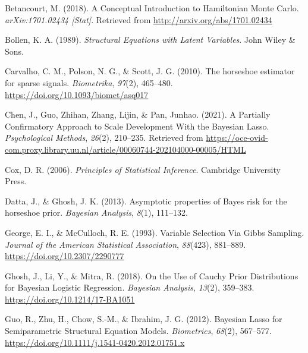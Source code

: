 \documentclass[
  man, donotrepeattitle,floatsintext]{apa6}
\newlength{\cslhangindent}
\newlength{\cslentryspacingunit} %
\newenvironment{CSLReferences}[2] %
 {%
  \setlength{\parindent}{0pt}
  \ifodd #1
  \let\oldpar\par
  \def\par{\hangindent=\cslhangindent\oldpar}
  \fi
  \setlength{\parskip}{#2\cslentryspacingunit}
 }%
 {}
\begin{document}
\hypertarget{refs}{}
\begin{CSLReferences}{1}{0}
\leavevmode{}%
Betancourt, M. (2018). A {Conceptual} {Introduction} to {Hamiltonian} {Monte} {Carlo}. \emph{arXiv:1701.02434 {[}Stat{]}}. Retrieved from \url{http://arxiv.org/abs/1701.02434}

\leavevmode{}%
Bollen, K. A. (1989). \emph{Structural {Equations} with {Latent} {Variables}}. John Wiley \& Sons.

\leavevmode{}%
Carvalho, C. M., Polson, N. G., \& Scott, J. G. (2010). The horseshoe estimator for sparse signals. \emph{Biometrika}, \emph{97}(2), 465--480. \url{https://doi.org/10.1093/biomet/asq017}

\leavevmode{}%
Chen, J., Guo, Zhihan, Zhang, Lijin, \& Pan, Junhao. (2021). A {Partially} {Confirmatory} {Approach} to {Scale} {Development} {With} the {Bayesian} {Lasso}. \emph{Psychological Methods}, \emph{26}(2), 210--235. Retrieved from \url{https://oce-ovid-com.proxy.library.uu.nl/article/00060744-202104000-00005/HTML}

\leavevmode{}%
Cox, D. R. (2006). \emph{Principles of {Statistical} {Inference}}. Cambridge University Press.

\leavevmode{}%
Datta, J., \& Ghosh, J. K. (2013). Asymptotic properties of {Bayes} risk for the horseshoe prior. \emph{Bayesian Analysis}, \emph{8}(1), 111--132.

\leavevmode{}%
George, E. I., \& McCulloch, R. E. (1993). Variable {Selection} {Via} {Gibbs} {Sampling}. \emph{Journal of the American Statistical Association}, \emph{88}(423), 881--889. \url{https://doi.org/10.2307/2290777}

\leavevmode{}%
Ghosh, J., Li, Y., \& Mitra, R. (2018). On the {Use} of {Cauchy} {Prior} {Distributions} for {Bayesian} {Logistic} {Regression}. \emph{Bayesian Analysis}, \emph{13}(2), 359--383. \url{https://doi.org/10.1214/17-BA1051}

\leavevmode{}%
Guo, R., Zhu, H., Chow, S.-M., \& Ibrahim, J. G. (2012). Bayesian {Lasso} for {Semiparametric} {Structural} {Equation} {Models}. \emph{Biometrics}, \emph{68}(2), 567--577. \url{https://doi.org/10.1111/j.1541-0420.2012.01751.x}


\end{CSLReferences}
\end{document}
